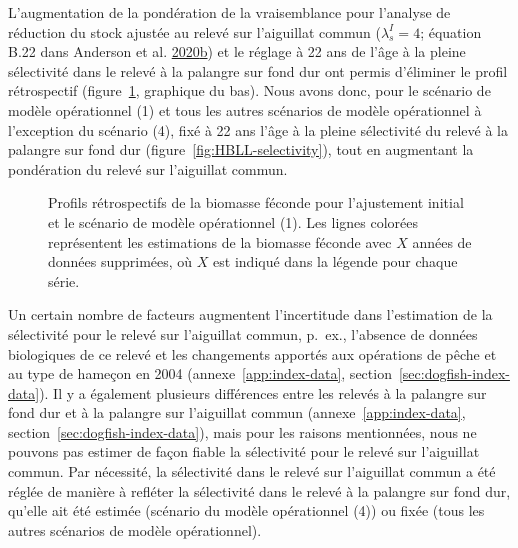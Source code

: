 \documentclass[11pt]{book}
\begin{document}
L'augmentation de la pondération de la vraisemblance pour l'analyse de réduction du stock ajustée au relevé sur l'aiguillat commun (\(\lambda^I_s = 4\); équation B.22 dans Anderson et al. \protect\hyperlink{ref-anderson2020gfmp}{2020}\protect\hyperlink{ref-anderson2020gfmp}{b}) et le réglage à 22 ans de l'âge à la pleine sélectivité dans le relevé à la palangre sur fond dur ont permis d'éliminer le profil rétrospectif (figure~\ref{fig:retro-initial}, graphique du bas). Nous avons donc, pour le scénario de modèle opérationnel (1) et tous les autres scénarios de modèle opérationnel à l'exception du scénario (4), fixé à 22 ans l'âge à la pleine sélectivité du relevé à la palangre sur fond dur (figure~\ref{fig:HBLL-selectivity}), tout en augmentant la pondération du relevé sur l'aiguillat commun.


\begin{figure}[htb]

{\centering {} 

}

\caption{Profils rétrospectifs de la biomasse féconde pour l'ajustement initial et le scénario de modèle opérationnel (1). Les lignes colorées représentent les estimations de la biomasse féconde avec \(X\) années de données supprimées, où \(X\) est indiqué dans la légende pour chaque série.}\label{fig:retro-initial}
\end{figure}
Un certain nombre de facteurs augmentent l'incertitude dans l'estimation de la sélectivité pour le relevé sur l'aiguillat commun, p.~ex., l'absence de données biologiques de ce relevé et les changements apportés aux opérations de pêche et au type de hameçon en 2004 (annexe~\ref{app:index-data}, section~\ref{sec:dogfish-index-data}). Il y a également plusieurs différences entre les relevés à la palangre sur fond dur et à la palangre sur l'aiguillat commun (annexe~\ref{app:index-data}, section~\ref{sec:dogfish-index-data}), mais pour les raisons mentionnées, nous ne pouvons pas estimer de façon fiable la sélectivité pour le relevé sur l'aiguillat commun. Par nécessité, la sélectivité dans le relevé sur l'aiguillat commun a été réglée de manière à refléter la sélectivité dans le relevé à la palangre sur fond dur, qu'elle ait été estimée (scénario du modèle opérationnel (4)) ou fixée (tous les autres scénarios de modèle opérationnel).
\end{document}
